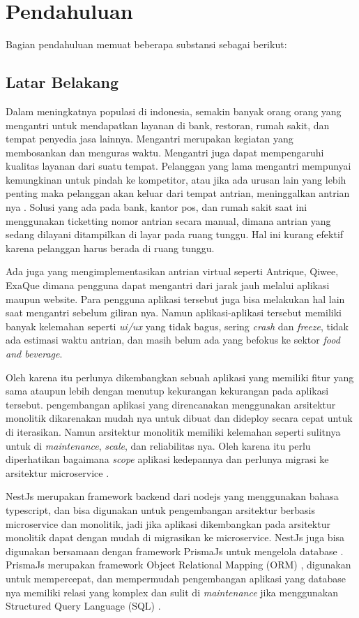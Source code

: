 \chapter{Pendahuluan}
Bagian pendahuluan memuat beberapa substansi sebagai berikut:

\section{Latar Belakang}
Dalam meningkatnya populasi di indonesia, semakin banyak orang orang yang mengantri untuk mendapatkan layanan di bank, restoran, rumah sakit, dan tempat penyedia jasa lainnya. Mengantri merupakan kegiatan yang membosankan dan menguras waktu. Mengantri juga dapat mempengaruhi kualitas layanan dari suatu tempat. Pelanggan yang lama mengantri mempunyai kemungkinan untuk pindah ke kompetitor, atau jika ada urusan lain yang lebih penting maka pelanggan akan keluar dari tempat antrian, meninggalkan antrian nya \cite{khong2017queue}\cite{Ghazal2016}\cite{Uddin2016}. Solusi yang ada pada bank, kantor pos, dan rumah sakit saat ini menggunakan ticketting nomor antrian secara manual, dimana antrian yang sedang dilayani ditampilkan di layar pada ruang tunggu. Hal ini kurang efektif karena pelanggan harus berada di ruang tunggu\cite{Ghazal2016}.

Ada juga yang mengimplementasikan antrian virtual seperti Antrique, Qiwee, ExaQue dimana pengguna dapat mengantri dari jarak jauh melalui aplikasi maupun website. Para pengguna aplikasi tersebut juga bisa melakukan hal lain saat mengantri sebelum giliran nya. Namun aplikasi-aplikasi tersebut memiliki banyak kelemahan seperti \textit{ui/ux} yang tidak bagus, sering \textit{crash} dan \textit{freeze}, tidak ada estimasi waktu antrian, dan masih belum ada yang befokus ke sektor \textit{food and beverage}.

Oleh karena itu perlunya dikembangkan sebuah aplikasi yang memiliki fitur yang sama ataupun lebih dengan menutup kekurangan kekurangan pada aplikasi tersebut.
pengembangan aplikasi yang direncanakan menggunakan arsitektur monolitik dikarenakan mudah nya untuk dibuat dan dideploy secara cepat untuk di iterasikan. Namun arsitektur monolitik memiliki kelemahan seperti sulitnya untuk di \textit{maintenance}, \textit{scale}, dan reliabilitas nya. Oleh karena itu perlu diperhatikan bagaimana \textit{scope} aplikasi kedepannya dan perlunya migrasi ke arsitektur microservice \cite{gos2020comparison}.

NestJs merupakan framework backend dari nodejs yang menggunakan bahasa typescript, dan bisa digunakan untuk pengembangan arsitektur berbasis microservice dan monolitik, jadi jika aplikasi dikembangkan pada arsitektur monolitik dapat dengan mudah di migrasikan ke microservice. NestJs juga bisa digunakan bersamaan dengan framework PrismaJs untuk mengelola database \cite{NestJS}. PrismaJs merupakan framework Object Relational Mapping (ORM) \cite{Prisma}, digunakan untuk mempercepat, dan mempermudah pengembangan aplikasi yang database nya memiliki relasi yang komplex dan sulit di \textit{maintenance} jika menggunakan Structured Query Language (SQL) \cite{Zmaranda2020}.

